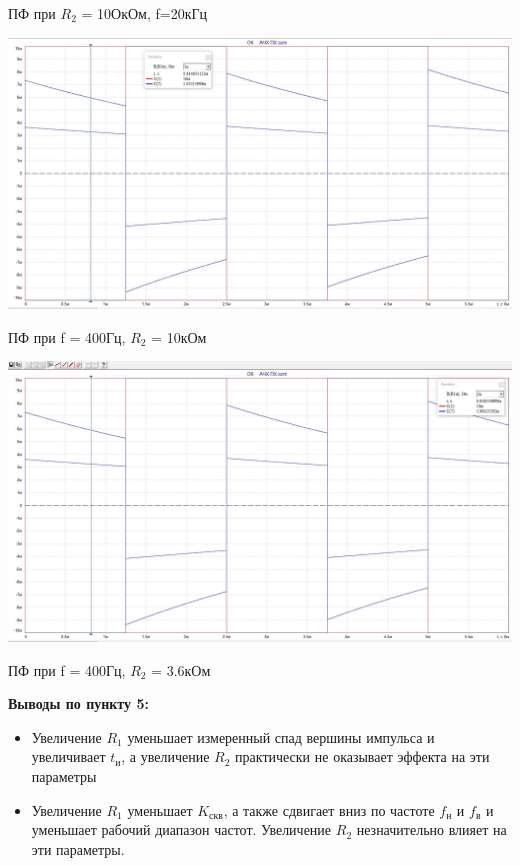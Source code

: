 \documentclass[a4paper,14pt]{extarticle}
\begin{document}
    ПФ при $R_2$ = 10ОкОм, f=20кГц

    \begin{center}
        \includegraphics[scale=0.3]{5.3.jpg}
    \end{center}
    
    ПФ при f = 400Гц, $R_2$ = 10кОм 

    \begin{center}
        \includegraphics[scale=0.3]{5.4.jpg}
    \end{center}

    ПФ при f = 400Гц, $R_2$ = 3.6кОм 

    \textbf{Выводы по пункту 5:}
    \vspace{-6ex}
    \begin{singlespace}
        \begin{itemize}
           \item Увеличение $R_1$ уменьшает измеренный спад вершины импульса и увеличивает 
           $t_{\text{и}}$, а увеличение $R_2$ практически не оказывает эффекта на эти параметры 
           \item Увеличение $R_1$ уменьшает $K_{\text{скв}}$, а также сдвигает вниз по 
           частоте $f_{\text{н}}$ и $f_{\text{в}}$ и уменьшает рабочий диапазон частот. 
           Увеличение $R_2$ незначительно влияет на эти параметры.
        \end{itemize}
    \end{singlespace}
\end{document}

